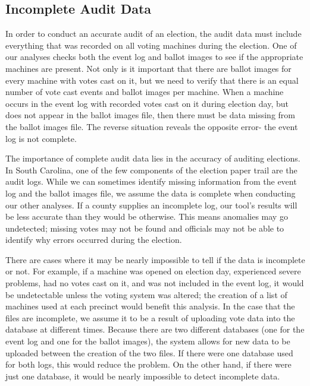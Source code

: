 \subsection{Incomplete Audit Data}
In order to conduct an accurate audit of an election, the audit data must include everything that was recorded on all voting machines during the election.  One of our analyses checks both the event log and ballot images to see if the appropriate machines are present.  Not only is it important that there are ballot images for every machine with votes cast on it, but we need to verify that there is an equal number of vote cast events and ballot images per machine.  When a machine occurs in the event log with recorded votes cast on it during election day, but does not appear in the ballot images file, then there must be data missing from the ballot images file.  The reverse situation reveals the opposite error- the event log is not complete.  

The importance of complete audit data lies in the accuracy of auditing elections.  In South Carolina, one of the few components of the election paper trail are the audit logs.  While we can sometimes identify missing information from the event log and the ballot images file, we assume the data is complete when conducting our other analyses.  If a county supplies an incomplete log, our tool's results will be less accurate than they would be otherwise.  This means anomalies may go undetected; missing votes may not be found and officials may not be able to identify why errors occurred during the election.  

There are cases where it may be nearly impossible to tell if the data is incomplete or not.  For example, if a machine was opened on election day, experienced severe problems, had no votes cast on it, and was not included in the event log, it would be undetectable unless the voting system was altered; the creation of a list of machines used at each precinct would benefit this analysis.  In the case that the files are incomplete, we assume it to be a result of uploading vote data into the database at different times.  Because there are two different databases (one for the event log and one for the ballot images), the system allows for new data to be uploaded between the creation of the two files.  If there were one database used for both logs, this would reduce the problem.  On the other hand, if there were just one database, it would be nearly impossible to detect incomplete data.  

